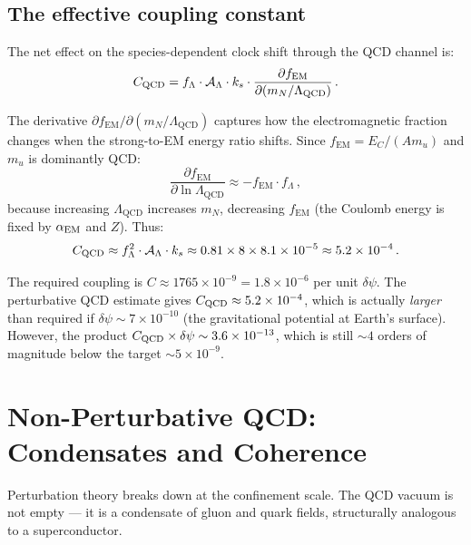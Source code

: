 \documentclass[aps,prd,twocolumn,superscriptaddress,floatfix,nofootinbib]{revtex4-2}
\newcommand{\LQCD}{\Lambda_{\mathrm{QCD}}}
\newcommand{\fEM}{f_{\mathrm{EM}}}
\newcommand{\mN}{m_N}
\begin{document}
\subsection{The effective coupling constant}

The net effect on the species-dependent clock shift through the QCD channel is:
\begin{equation}
C_{\rm QCD} = f_\Lambda \cdot \mathcal{A}_\Lambda \cdot k_s \cdot
\frac{\partial \fEM}{\partial(\mN/\LQCD)} \, .
\label{eq:C_QCD}
\end{equation}

The derivative $\partial\fEM / \partial(\mN/\LQCD)$ captures how the
electromagnetic fraction changes when the strong-to-EM energy ratio shifts. Since
$\fEM = E_C / (A m_u)$ and $m_u$ is dominantly QCD:
\begin{equation}
\frac{\partial\fEM}{\partial\ln\LQCD} \approx -\fEM \cdot f_\Lambda \, ,
\end{equation}
because increasing $\LQCD$ increases $\mN$, decreasing $\fEM$ (the Coulomb
energy is fixed by $\alpha_{\rm EM}$ and $Z$). Thus:
\begin{equation}
C_{\rm QCD} \approx f_\Lambda^2 \cdot \mathcal{A}_\Lambda \cdot k_s \approx
0.81 \times 8 \times 8.1 \times 10^{-5} \approx 5.2 \times 10^{-4} \, .
\label{eq:C_QCD_num}
\end{equation}

The required coupling is $C \approx 1765 \times 10^{-9} = 1.8 \times 10^{-6}$
per unit $\delta\psi$. The perturbative QCD estimate gives $C_{\rm QCD} \approx
5.2 \times 10^{-4}$, which is actually \emph{larger} than required if
$\delta\psi \sim 7 \times 10^{-10}$ (the gravitational potential at Earth's
surface). However, the product $C_{\rm QCD} \times \delta\psi \sim 3.6 \times
10^{-13}$, which is still $\sim 4$ orders of magnitude below the target $\sim 5
\times 10^{-9}$.


\section{Non-Perturbative QCD: Condensates and Coherence}
\label{sec:nonpert}

Perturbation theory breaks down at the confinement scale. The QCD vacuum is not
empty --- it is a condensate of gluon and quark fields, structurally analogous to
a superconductor.
\end{document}
